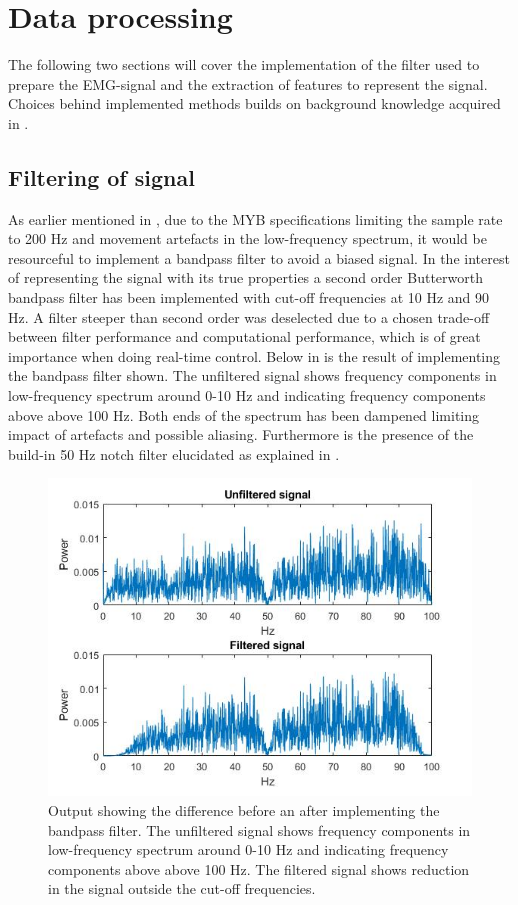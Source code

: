 

\section{Data processing} \label{sec:M:dataProcessing}

The following two sections will cover the implementation of the filter used to prepare the EMG-signal and the extraction of features to represent the signal. Choices behind implemented methods builds on background knowledge acquired in .

\subsection{Filtering of signal} \label{sub:M:filtering} 

As earlier mentioned in , due to the MYB specifications limiting the sample rate to 200 Hz and movement artefacts in the low-frequency spectrum, it would be resourceful to implement a bandpass filter to avoid a biased signal.
In the interest of representing the signal with its true properties a second order Butterworth bandpass filter has been implemented with cut-off frequencies at 10 Hz and 90 Hz. A filter steeper than second order was deselected due to a chosen trade-off between filter performance and computational performance, which is of great importance when doing real-time control. Below in  is the result of implementing the bandpass filter shown. The unfiltered signal shows frequency components in low-frequency spectrum around 0-10 Hz and indicating frequency components above above 100 Hz. Both ends of the spectrum has been dampened limiting impact of artefacts and possible aliasing. Furthermore is the presence of the build-in 50 Hz notch filter elucidated as explained in .     


\begin{figure}[H]                 
\includegraphics[width=.8\textwidth]{figures/pMethods/Filt}  
\caption{Output showing the difference before an after implementing the bandpass filter. The unfiltered signal shows frequency components in low-frequency spectrum around 0-10 Hz and indicating frequency components above above 100 Hz. The filtered signal shows reduction in the signal outside the cut-off frequencies.}
\label{fig:filt} 
\end{figure}






